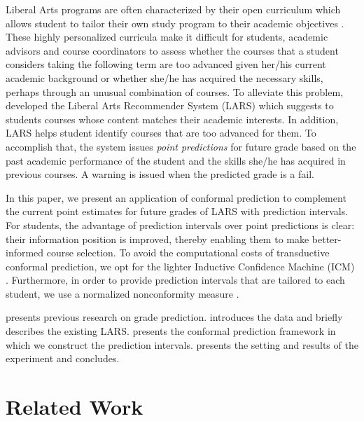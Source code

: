 \documentclass[pmlr]{jmlr}%
\begin{document}
Liberal Arts programs are often characterized by their open curriculum which allows student to tailor their own study program to their academic objectives \citep{Surpatean.2012, Morsomme.2019}. These highly personalized curricula make it difficult for students, academic advisors and course coordinators to assess whether the courses that a student considers taking the following term are too advanced given her/his current academic background or whether she/he has acquired the necessary skills, perhaps through an unusual combination of courses. To alleviate this problem, \citet{Morsomme.2019} developed the Liberal Arts Recommender System (LARS) which suggests to students courses whose content matches their academic interests. In addition, LARS helps student identify courses that are too advanced for them. To accomplish that, the system issues \textit{point predictions} for future grade based on the past academic performance of the student and the skills she/he has acquired in previous courses. A warning is issued when the predicted grade is a fail.

In this paper, we present an application of conformal prediction \citep{Vovk.2005} to complement the current point estimates for future grades of LARS with prediction intervals. For students, the advantage of prediction intervals over point predictions is clear: their information position is improved, thereby enabling them to make better-informed course selection. To avoid the computational costs of transductive conformal prediction, we opt for the lighter Inductive Confidence Machine (ICM) \citep{Papadopoulos.2002}. Furthermore, in order to provide prediction intervals that are tailored to each student, we use a normalized nonconformity measure \citep{Papadopoulos.2011}.

 presents previous research on grade prediction.
 introduces the data and  briefly describes the existing LARS.
 presents the conformal prediction framework in which we construct the prediction intervals.
 presents the setting and results of the experiment
and  concludes.

\section{Related Work}
\label{sec:related}
\end{document}
